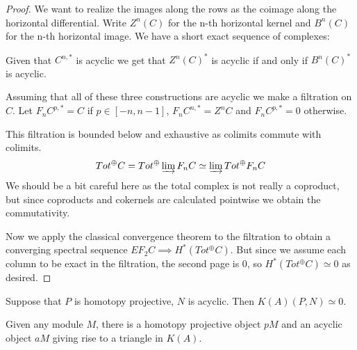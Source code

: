 \documentclass[../thesis.tex]{subfiles}
\begin{document}
            \begin{proof}
                We want to realize the images along the rows as the coimage along the horizontal differential. Write $Z^n(C)$ for the n-th horizontal kernel and $B^n(C)$ for the n-th horizontal image. We have a short exact sequence of complexes:

                \begin{center}
                \end{center}

                Given that $C^{n,*}$ is acyclic we get that $Z^n(C)^*$ is acyclic if and only if $B^n(C)^*$ is acyclic.

                Assuming that all of these three constructions are acyclic we make a filtration on $C$. Let $F_nC^{p,*} = C$ if $p \in [-n, n-1]$, $F_nC^{n,*} = Z^nC$ and $F_nC^{p,*} = 0$ otherwise.

                This filtration is bounded below and exhaustive as colimits commute with colimits.
                \begin{align*}
                    Tot^\oplus C = Tot^\oplus \varinjlim F_nC \simeq \varinjlim Tot^\oplus F_nC
                \end{align*}
                We should be a bit careful here as the total complex is not really a coproduct, but since coproducts and cokernels are calculated pointwise we obtain the commutativity.

                Now we apply the classical convergence theorem to the filtration to obtain a converging spectral sequence $EF_2C \implies H^*(Tot^\oplus C)$. But since we assume each column to be exact in the filtration, the second page is $0$, so $H^*(Tot^\oplus C) \simeq 0$ as desired. 
            \end{proof}

            \begin{thm}
                Suppose that $P$ is homotopy projective, $N$ is acyclic. Then $K(A)(P, N)\simeq 0$.

                Given any module $M$, there is a homotopy projective object $pM$ and an acyclic object $aM$ giving rise to a triangle in $K(A)$.
                \begin{center}
                \end{center}
            \end{thm}
\end{document}
